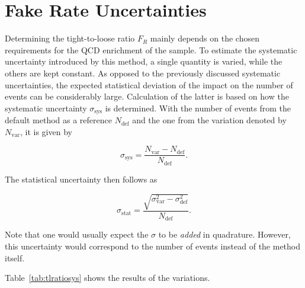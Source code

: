 \section{Fake Rate Uncertainties}
\label{sec:tlsys}

Determining the tight-to-loose ratio $F_R$ mainly depends on the chosen requirements for the QCD enrichment of the sample. To estimate the systematic uncertainty introduced by this method, a single quantity is varied, while the others are kept constant. As opposed to the previously discussed systematic uncertainties, the expected statistical deviation of the impact on the number of events can be considerably large. Calculation of the latter is based on how the systematic uncertainty $\sigma_{\text{sys}}$ is determined. With the number of events from the default method as a reference $N_{\text{def}}$ and the one from the variation denoted by $N_{\text{var}}$, it is given by

\begin{equation}
  \label{eq:frsysabs}
  \sigma_{\text{sys}} = \frac{N_{\text{var}} - N_{\text{def}}}{N_{\text{def}}}.
\end{equation}

\noindent The statistical uncertainty then follows as

\begin{equation}
  \label{eq:frstatabs}
  \sigma_{\text{stat}} = \frac{\sqrt{\sigma_{\text{var}}^2 - \sigma_{\text{def}}^2}}{N_{\text{def}}}.
\end{equation}

\noindent Note that one would usually expect the $\sigma$ to be \textit{added} in quadrature. However, this uncertainty would correspond to the number of events instead of the method itself.

Table~\ref{tab:tlratiosys} shows the results of the variations.

